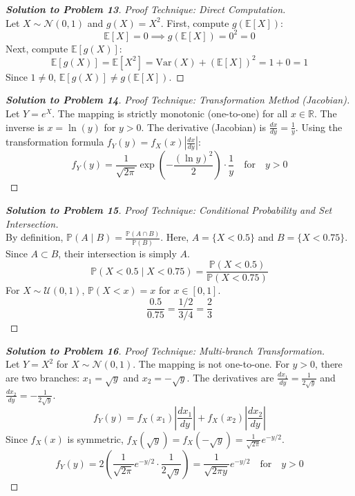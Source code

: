 \documentclass[11pt, a4paper]{article}
\theoremstyle{definition}
\theoremstyle{remark}
\newcommand{\R}{\mathbb{R}}
\newcommand{\E}{\mathbb{E}}
\newcommand{\Prob}{\mathbb{P}}
\begin{document}
\begin{proof}[\textbf{Solution to Problem 13}]
\textit{Proof Technique: Direct Computation.} \\
Let $X \sim \mathcal{N}(0, 1)$ and $g(X) = X^2$.
First, compute $g(\E[X])$:
\[ \E[X] = 0 \implies g(\E[X]) = 0^2 = 0 \]
Next, compute $\E[g(X)]$:
\[ \E[g(X)] = \E[X^2] = \text{Var}(X) + (\E[X])^2 = 1 + 0 = 1 \]
Since $1 \neq 0$, $\E[g(X)] \neq g(\E[X])$.
\end{proof}

\begin{proof}[\textbf{Solution to Problem 14}]
\textit{Proof Technique: Transformation Method (Jacobian).} \\
Let $Y = e^X$. The mapping is strictly monotonic (one-to-one) for all $x \in \R$. The inverse is $x = \ln(y)$ for $y > 0$.
The derivative (Jacobian) is $\frac{dx}{dy} = \frac{1}{y}$.
Using the transformation formula $f_Y(y) = f_X(x) \left| \frac{dx}{dy} \right|$:
\[ f_Y(y) = \frac{1}{\sqrt{2\pi}} \exp\left(-\frac{(\ln y)^2}{2}\right) \cdot \frac{1}{y} \quad \text{for} \quad y > 0 \]
\end{proof}

\begin{proof}[\textbf{Solution to Problem 15}]
\textit{Proof Technique: Conditional Probability and Set Intersection.} \\
By definition, $\Prob(A \mid B) = \frac{\Prob(A \cap B)}{\Prob(B)}$.
Here, $A = \{X < 0.5\}$ and $B = \{X < 0.75\}$. Since $A \subset B$, their intersection is simply $A$.
\[ \Prob(X < 0.5 \mid X < 0.75) = \frac{\Prob(X < 0.5)}{\Prob(X < 0.75)} \]
For $X \sim \mathcal{U}(0, 1)$, $\Prob(X < x) = x$ for $x \in [0,1]$.
\[ \frac{0.5}{0.75} = \frac{1/2}{3/4} = \frac{2}{3} \]
\end{proof}

\begin{proof}[\textbf{Solution to Problem 16}]
\textit{Proof Technique: Multi-branch Transformation.} \\
Let $Y = X^2$ for $X \sim \mathcal{N}(0, 1)$. The mapping is not one-to-one. For $y > 0$, there are two branches: $x_1 = \sqrt{y}$ and $x_2 = -\sqrt{y}$.
The derivatives are $\frac{dx_1}{dy} = \frac{1}{2\sqrt{y}}$ and $\frac{dx_2}{dy} = -\frac{1}{2\sqrt{y}}$.
\[ f_Y(y) = f_X(x_1)\left|\frac{dx_1}{dy}\right| + f_X(x_2)\left|\frac{dx_2}{dy}\right| \]
Since $f_X(x)$ is symmetric, $f_X(\sqrt{y}) = f_X(-\sqrt{y}) = \frac{1}{\sqrt{2\pi}}e^{-y/2}$.
\[ f_Y(y) = 2 \left( \frac{1}{\sqrt{2\pi}}e^{-y/2} \cdot \frac{1}{2\sqrt{y}} \right) = \frac{1}{\sqrt{2\pi y}} e^{-y/2} \quad \text{for} \quad y > 0 \]
\end{proof}
\end{document}
